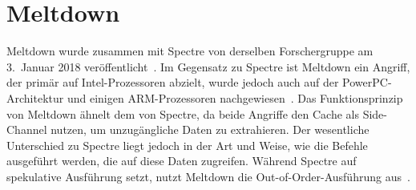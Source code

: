 \section{Meltdown}\label{sec:meltdown}
Meltdown wurde zusammen mit Spectre von derselben Forschergruppe am 3.~Januar 2018 veröffentlicht~\cite{kocher2018spectre}.
Im Gegensatz zu Spectre ist Meltdown ein Angriff, der primär auf Intel-Prozessoren abzielt, wurde jedoch auch auf der PowerPC-Architektur und einigen ARM-Prozessoren nachgewiesen~\cite{cve_2024_45333}.
Das Funktionsprinzip von Meltdown ähnelt dem von Spectre, da beide Angriffe den Cache als Side-Channel nutzen, um unzugängliche Daten zu extrahieren.
Der wesentliche Unterschied zu Spectre liegt jedoch in der Art und Weise, wie die Befehle ausgeführt werden, die auf diese Daten zugreifen.
Während Spectre auf spekulative Ausführung setzt, nutzt Meltdown die Out-of-Order-Ausführung aus~\cite{kocher2018meltdown}.

